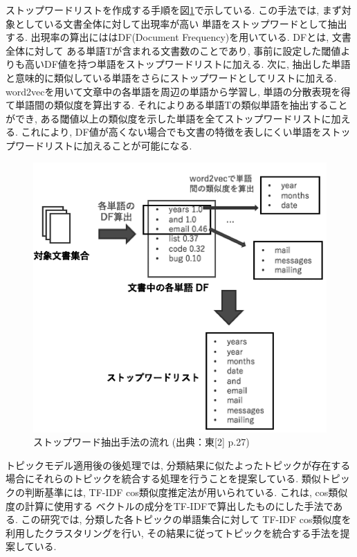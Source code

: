 \documentclass{ltjarticle}
\begin{document}
ストップワードリストを作成する手順を図\ref{fig:関連研究2ストップワード}で示している. この手法では, まず対象としている文書全体に対して出現率が高い
単語をストップワードとして抽出する. 出現率の算出にははDF(Document Frequency)を用いている. DFとは, 文書全体に対して
ある単語Tが含まれる文書数のことであり, 事前に設定した閾値よりも高いDF値を持つ単語をストップワードリストに加える. 
次に, 抽出した単語と意味的に類似している単語をさらにストップワードとしてリストに加える. 
word2vecを用いて文章中の各単語を周辺の単語から学習し, 単語の分散表現を得て単語間の類似度を算出する.  
それによりある単語Tの類似単語を抽出することができ, ある閾値以上の類似度を示した単語を全てストップワードリストに加える. 
これにより, DF値が高くない場合でも文書の特徴を表しにくい単語をストップワードリストに加えることが可能になる. 
\begin{figure}[h]
    \centering
    \includegraphics[]{images/fig3.png}
    \caption{ストップワード抽出手法の流れ (出典：東[2] p.27)}
    \label{fig:関連研究2ストップワード}
\end{figure}

トピックモデル適用後の後処理では, 分類結果に似たよったトピックが存在する場合にそれらのトピックを統合する処理を行うことを提案している. 
類似トピックの判断基準には, TF-IDF cos類似度推定法が用いられている. これは, cos類似度の計算に使用する
ベクトルの成分をTF-IDFで算出したものにした手法である. この研究では, 分類した各トピックの単語集合に対して
TF-IDF cos類似度を利用したクラスタリングを行い, その結果に従ってトピックを統合する手法を提案している. 
\end{document}
